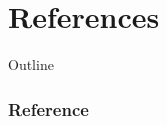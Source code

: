 \documentclass[12pt, xcolor=dvipsnames]{beamer}
\begin{document}
\section{References}
\begin{frame}[allowframebreaks]{Outline}
	\frametitle{Reference}
	
	
	\nocite{Perform}
	\nocite{DataMining}
	\nocite{FactoryOfTheFuture}
	\nocite{Harmonized}
	\nocite{Hybrid}
	\nocite{ModularProduction}
	\nocite{PlugProduce}
	\nocite{HighlyFlexible}
\end{frame}
\end{document}
